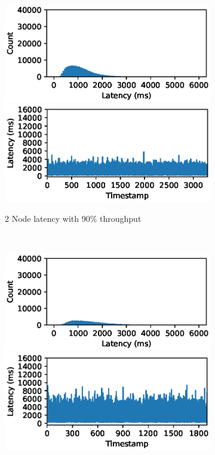 \begin{figure}
    \begin{subfigure}[b]{0.3\textwidth}
        \includegraphics[width=\textwidth]{eps/storm_agg_2node_th_90_hist}
         \includegraphics[width=\textwidth]{eps/storm_agg_2node_th_90_ts}

        \caption{2 Node latency with 90\% throughput }
    \end{subfigure}
    ~ 
    \begin{subfigure}[b]{0.3\textwidth}
        \includegraphics[width=\textwidth]{eps/storm_agg_4node_th_90_hist}
         \includegraphics[width=\textwidth]{eps/storm_agg_4node_th_90_ts}


\end{subfigure}
\end{figure}

